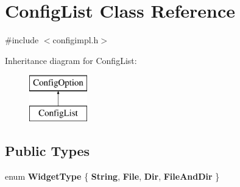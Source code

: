 \hypertarget{class_config_list}{}\section{Config\+List Class Reference}
\label{class_config_list}


{\ttfamily \#include $<$configimpl.\+h$>$}

Inheritance diagram for Config\+List\+:\begin{figure}[H]
\begin{center}
\leavevmode
\includegraphics[height=2.000000cm]{class_config_list}
\end{center}
\end{figure}
\subsection*{Public Types}
\begin{DoxyCompactItemize}
\item 
\mbox{\label{class_config_list_a562e3dbe5fc70f1af7ed4e748dae0ae9}} 
enum {\bfseries Widget\+Type} \{ {\bfseries String}, 
{\bfseries File}, 
{\bfseries Dir}, 
{\bfseries File\+And\+Dir}
 \}
\end{DoxyCompactItemize}

